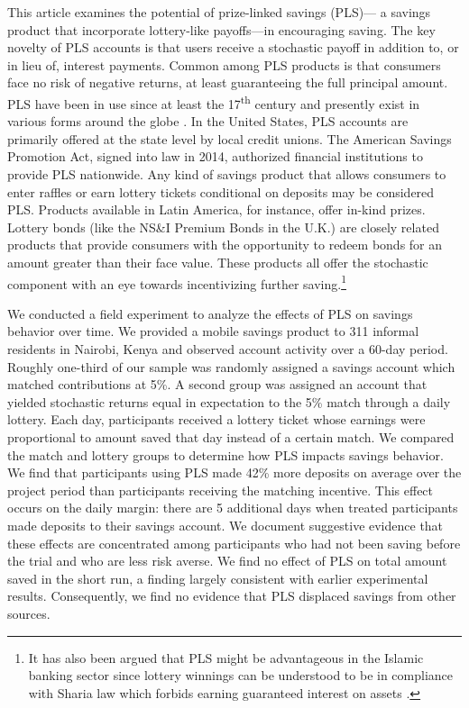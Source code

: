 \documentclass[11pt]{article}
\begin{document}
	This article examines the potential of prize-linked savings (PLS)--- a savings product that incorporate lottery-like payoffs---in encouraging saving. The key novelty of PLS accounts is that users receive a stochastic payoff in addition to, or in lieu of, interest payments. Common among PLS products is that consumers face no risk of negative returns, at least guaranteeing the full principal amount. PLS have been in use since at least the 17\textsuperscript{th} century and presently exist in various forms around the globe \parencite{murphy_lotteries_2005,kearney_making_2010}. In the United States, PLS accounts are primarily offered at the state level by local credit unions. The American Savings Promotion Act, signed into law in 2014, authorized financial institutions to provide PLS nationwide. Any kind of savings product that allows consumers to enter raffles or earn lottery tickets conditional on deposits may be considered PLS. Products available in Latin America, for instance, offer in-kind prizes. Lottery bonds (like the NS\&I Premium Bonds in the U.K.) are closely related products that provide consumers with the opportunity to redeem bonds for an amount greater than their face value. These products all offer the stochastic component with an eye towards incentivizing further saving.\footnote{It has also been argued that PLS might be advantageous in the Islamic banking sector since lottery winnings can be understood to be in compliance with Sharia law which forbids earning guaranteed interest on assets \parencite{ruth_how_2018}.}


	We conducted a field experiment to analyze the effects of PLS on savings behavior over time. We provided a mobile savings product to 311 informal residents in Nairobi, Kenya and observed account activity over a 60-day period. Roughly one-third of our sample was randomly assigned a savings account which matched contributions at 5\%. A second group was assigned an account that yielded stochastic returns equal in expectation to the 5\% match through a daily lottery. Each day, participants received a lottery ticket whose earnings were proportional to amount saved that day instead of a certain match. We compared the match and lottery groups to determine how PLS impacts savings behavior. We find that participants using PLS made 42\% more deposits on average over the project period than participants receiving the matching incentive. This effect occurs on the daily margin: there are 5 additional days when treated participants made deposits to their savings account. We document suggestive evidence that these effects are concentrated among participants who had not been saving before the trial and who are less risk averse. We find no effect of PLS on total amount saved in the short run, a finding largely consistent with earlier experimental results. Consequently, we find no evidence that PLS displaced savings from other sources. 
\end{document}
